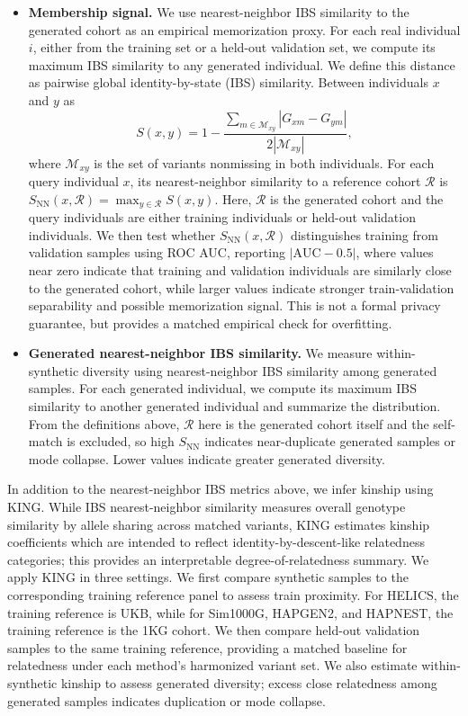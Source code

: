 \documentclass{article}
\begin{document}
\begin{itemize}
    \item \textbf{Membership signal.}
    We use nearest-neighbor IBS similarity to the generated cohort as an empirical memorization proxy. For each real individual \(i\), either from the training set or a held-out validation set, we compute its maximum IBS similarity to any generated individual. We define this distance as pairwise global identity-by-state (IBS) similarity. Between individuals \(x\) and \(y\) as
    \[
    S(x,y)
    =
    1-
    \frac{\sum_{m\in\mathcal M_{xy}} |G_{xm}-G_{ym}|}
    {2|\mathcal M_{xy}|},
    \]
    where \(\mathcal M_{xy}\) is the set of variants nonmissing in both individuals. For each query individual \(x\), its nearest-neighbor similarity to a reference cohort \(\mathcal R\) is
    \(
    S_{\mathrm{NN}}(x,\mathcal R)
    =
    \max_{y\in\mathcal R} S(x,y).
    \)
    Here, \(\mathcal R\) is the generated cohort and the query individuals are either training individuals or held-out validation individuals. We then test whether \(S_{\mathrm{NN}}(x,\mathcal R)\) distinguishes training from validation samples using ROC AUC, reporting \(|\mathrm{AUC}-0.5|\),
    where values near zero indicate that training and validation individuals are similarly close to the generated cohort, while larger values indicate stronger train-validation separability and possible memorization signal. This is not a formal privacy guarantee, but provides a matched empirical check for overfitting.

    \item \textbf{Generated nearest-neighbor IBS similarity.}
    We measure within-synthetic diversity using nearest-neighbor IBS similarity among generated samples.  For each generated individual, we compute its maximum IBS similarity to another generated individual and summarize the distribution. From the definitions above, \(\mathcal R\) here is the generated cohort itself and the self-match is excluded, so high \(S_{\mathrm{NN}}\) indicates near-duplicate generated samples or mode collapse. Lower values indicate greater generated diversity.
\end{itemize}

In addition to the nearest-neighbor IBS metrics above, we infer kinship using KING. While IBS nearest-neighbor similarity measures overall genotype similarity by allele sharing across matched variants, KING estimates kinship coefficients which are intended to reflect identity-by-descent-like relatedness categories; this provides an interpretable degree-of-relatedness summary. We apply KING in three settings. We first compare synthetic samples to the corresponding training reference panel to assess train proximity. For HELICS, the training reference is UKB, while for Sim1000G, HAPGEN2, and HAPNEST, the training reference is the 1KG cohort. We then compare held-out validation samples to the same training reference, providing a matched baseline for relatedness under each method's harmonized variant set. We also estimate within-synthetic kinship to assess generated diversity; excess close relatedness among generated samples indicates duplication or mode collapse.
\end{document}
